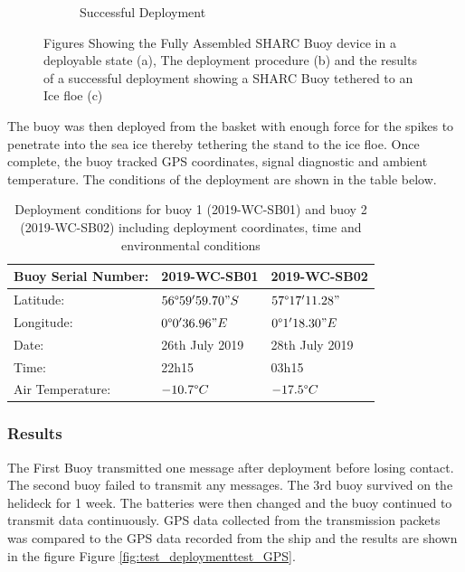 \begin{figure}[H]
\begin{subfigure}[h]{0.3\textwidth}
    \caption{Successful Deployment}
    \end{subfigure}%
    \caption{Figures Showing the  Fully Assembled SHARC Buoy device in a deployable state (a), The deployment procedure (b) and the results of a successful deployment showing a SHARC Buoy tethered to an Ice floe (c)}
    \label{fig:deployment}
\end{figure}
The buoy was then deployed from the basket with enough force for the spikes to penetrate into the sea ice thereby tethering the stand to the ice floe. Once complete, the buoy tracked GPS coordinates, signal diagnostic and ambient temperature. The conditions of the deployment are shown in the table below.
\begin{table}[H]
    \centering
    \caption{Deployment conditions for buoy 1 (2019-WC-SB01) and buoy 2 (2019-WC-SB02) including deployment coordinates, time and environmental conditions}
    \begin{tabular}{|l|l|l|}
    \hline
    Buoy Serial Number: & 2019-WC-SB01 & 2019-WC-SB02\\
    \hline
    Latitude: & $56\degree 59'59.70" S$ & $57\degree 17'11.28"$\\
    \hline
    Longitude: & $0\degree 0'36.96"E$ & $0\degree 1'18.30"E$\\
    \hline
    Date: & 26th July 2019 & 28th July 2019\\
    \hline
    Time: & 22h15 & 03h15\\
    \hline
    Air Temperature: & $-10.7 \degree C$ & $-17.5 \degree C$\\
    \hline
    \end{tabular}

    \label{tab:test_remotetest_Deployemt }
\end{table}

\subsubsection{Results}
\label{sec:ch4_results}

The First Buoy transmitted one message after deployment before losing contact. The second buoy failed to transmit any messages. The 3rd buoy survived on the helideck for 1 week. The batteries were then changed and the buoy continued to transmit data continuously. GPS data collected from the transmission packets was compared to the GPS data recorded from the ship and the results are shown in the figure Figure \ref{fig:test_deploymenttest_GPS}.


